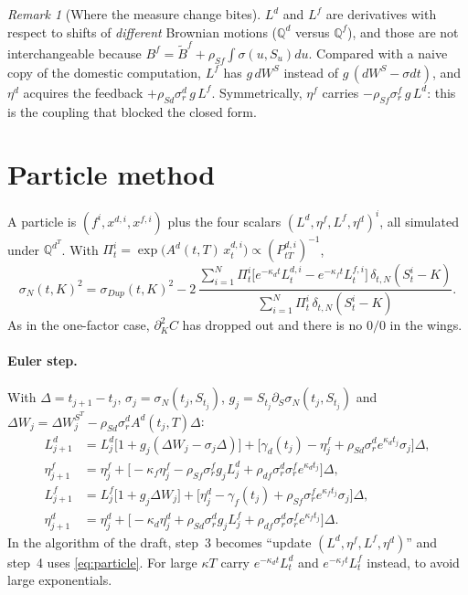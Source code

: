 \documentclass[11pt,a4paper]{article}
\theoremstyle{plain}
\theoremstyle{remark}
\newtheorem*{rem}{Remark}
\newcommand{\Q}{\mathbb{Q}}
\newcommand{\sgd}{\sigma^d_r}
\newcommand{\sgf}{\sigma^f_r}
\newcommand{\Ld}{L^{d}}
\newcommand{\Lf}{L^{f}}
\begin{document}
\begin{rem}[Where the measure change bites]
$\Ld$ and $\Lf$ are derivatives with respect to shifts of \emph{different}
Brownian motions ($\Q^d$ versus $\Q^f$), and those are not interchangeable
because $B^f=\widetilde B^f+\rho_{Sf}\int\sigma(u,S_u)du$. Compared with a
naive copy of the domestic computation, $\Lf$ has $g\,dW^S$ instead of
$g\,(dW^S-\sigma dt)$, and $\eta^d$ acquires the feedback
$+\rho_{Sd}\sgd\,g\,\Lf$. Symmetrically, $\eta^f$ carries
$-\rho_{Sf}\sgf\,g\,\Ld$: this is the coupling that blocked the closed form.
\end{rem}

\section{Particle method}

A particle is $(f^i,x^{d,i},x^{f,i})$ plus the four scalars
$(\Ld,\eta^f,\Lf,\eta^d)^i$, all simulated under $\Q^{d^T}$. With
$\Pi^i_t=\exp\!\big(A^d(t,T)\,x^{d,i}_t\big)\propto(P^{d,i}_{tT})^{-1}$,
\begin{equation}\label{eq:particle}
\sigma_N(t,K)^2=\sigma_{Dup}(t,K)^2
-2\,\frac{\sum_{i=1}^N\Pi^i_t\big[e^{-\kappa_dt}L^{d,i}_t-e^{-\kappa_ft}L^{f,i}_t\big]\,\delta_{t,N}(S^i_t-K)}
{\sum_{i=1}^N\Pi^i_t\,\delta_{t,N}(S^i_t-K)} .
\end{equation}
As in the one-factor case, $\partial_K^2C$ has dropped out and there is no
$0/0$ in the wings.

\paragraph{Euler step.} With $\Delta=t_{j+1}-t_j$,
$\sigma_j=\sigma_N(t_j,S_{t_j})$, $g_j=S_{t_j}\partial_S\sigma_N(t_j,S_{t_j})$
and $\Delta W_j=\Delta W^{S^T}_j-\rho_{Sd}\sgd A^d(t_j,T)\Delta$:
\begin{align*}
\Ld_{j+1}&=\Ld_j\big[1+g_j(\Delta W_j-\sigma_j\Delta)\big]
+\big[\gamma_d(t_j)-\eta^f_j+\rho_{Sd}\sgd e^{\kappa_dt_j}\sigma_j\big]\Delta,\\
\eta^f_{j+1}&=\eta^f_j+\big[-\kappa_f\eta^f_j-\rho_{Sf}\sgf g_j\Ld_j+\rho_{df}\sgd\sgf e^{\kappa_dt_j}\big]\Delta,\\
\Lf_{j+1}&=\Lf_j\big[1+g_j\Delta W_j\big]
+\big[\eta^d_j-\gamma_f(t_j)+\rho_{Sf}\sgf e^{\kappa_ft_j}\sigma_j\big]\Delta,\\
\eta^d_{j+1}&=\eta^d_j+\big[-\kappa_d\eta^d_j+\rho_{Sd}\sgd g_j\Lf_j+\rho_{df}\sgd\sgf e^{\kappa_ft_j}\big]\Delta.
\end{align*}
In the algorithm of the draft, step~3 becomes ``update
$(\Ld,\eta^f,\Lf,\eta^d)$'' and step~4 uses \eqref{eq:particle}. For large
$\kappa T$ carry $e^{-\kappa_dt}\Ld_t$ and $e^{-\kappa_ft}\Lf_t$ instead, to
avoid large exponentials.
\end{document}
